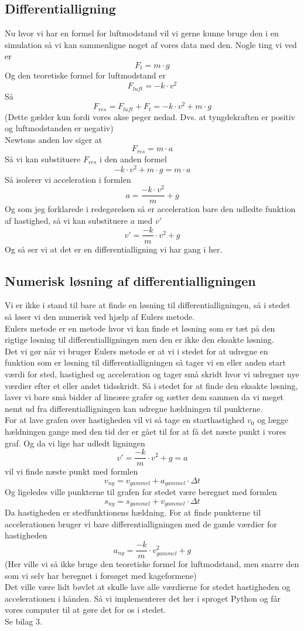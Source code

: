 \documentclass[12pt]{article}
\begin{document}
\subsection{Differentialligning}
Nu hvor vi har en formel for luftmodstand vil vi gerne kunne bruge den i en simulation så vi kan sammenligne noget af vores data med den.
Nogle ting vi ved er
$$F_{t}=m \cdot g$$
Og den teoretiske formel for luftmodstand er
$$F_{luft}=-k \cdot v^2$$
Så
$$F_{res}=F_{luft}+F_{t}=-k \cdot v^2 + m \cdot g$$
(Dette gælder kun fordi vores akse peger nedad. Dvs. at tyngdekraften er positiv og luftmodstanden er negativ)\\
Newtons anden lov siger at
$$F_{res}=m \cdot a$$
Så vi kan substituere $F_{res}$ i den anden formel
$$-k \cdot v^2 + m \cdot g = m \cdot a$$
Så isolerer vi acceleration i formlen
$$a = \frac{-k \cdot v^2}{m} + g$$
Og som jeg forklarede i redegørelsen så er acceleration bare den udledte funktion af hastighed, så vi kan substituere
$a$ med $v'$
$$v'=\frac{-k}{m}\cdot v^2 + g$$
Og så ser vi at det er en differentialligning vi har gang i her.

\subsection{Numerisk løsning af differentialligningen}
Vi er ikke i stand til bare at finde en løsning til differentialligningen, så i stedet så løser vi den numerisk ved hjælp af Eulers metode.\\
Eulers metode er en metode hvor vi kan finde et løsning som er tæt på den rigtige løsning til differentialligningen men den er ikke den eksakte løsning.\\
Det vi gør når vi bruger Eulers metode er at vi i stedet for at udregne en funktion som er løsning til differentialligningen så tager vi en eller anden start
værdi for sted, hastighed og acceleration og tager små skridt hvor vi udregner nye værdier efter et eller andet tidsskridt.
Så i stedet for at finde den eksakte løsning, laver vi bare små bidder af lineære grafer og sætter dem sammen da vi meget nemt ud fra differentialligningen kan udregne hældningen til punkterne.\\
For at lave grafen over hastigheden vil vi så tage en starthastighed $v_0$ og lægge hældningen gange med den tid der er gået til for at få det næste punkt i vores graf. Og da vi lige har udledt
ligningen
$$v'=\frac{-k}{m}\cdot v^2 + g = a$$
vil vi finde næste punkt med formlen
$$v_{ny}=v_{gammel}+a_{gammel} \cdot \Delta t$$
Og ligeledes ville punkterne til grafen for stedet være beregnet med formlen
$$s_{ny}=s_{gammel}+v_{gammel} \cdot \Delta t$$
Da hastigheden er stedfunktionens hældning.
For at finde punkterne til accelerationen bruger vi bare differentialligningen med de gamle værdier for hastigheden
$$a_{ny}=\frac{-k}{m} \cdot v_{gammel}^2+g$$
(Her ville vi så ikke bruge den teoretiske formel for luftmodstand, men snarre den som vi selv har beregnet i forsøget med kageformene)\\
Det ville være lidt bøvlet at skulle lave alle værdierne for stedet hastigheden og accelerationen i hånden. Så vi implementerer det her i sproget Python og får vores computer til at gøre det for os
i stedet.\\
Se bilag 3.
\end{document}
